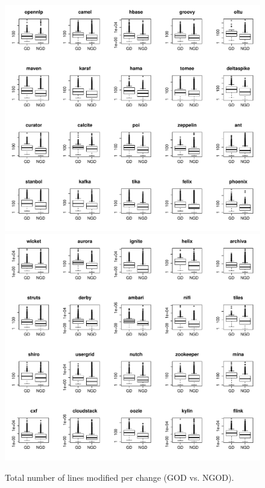 \begin{figure}[tb]
	\centering
	\includegraphics[width=120mm]{figures/chapter4/rq3_god_churn_logged_1}
	\includegraphics[width=120mm]{figures/chapter4/rq3_god_churn_logged_2}
	\caption{Total number of lines modified per change (GOD vs. NGOD).}
	\label{figure:total_number_of_lines_changed_god_vs_ngod}
\end{figure}


